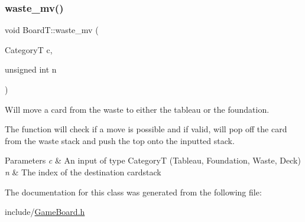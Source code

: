 \subsubsection{\texorpdfstring{waste\+\_\+mv()}{waste\_mv()}}
{\footnotesize\ttfamily void Board\+T\+::waste\+\_\+mv (\begin{DoxyParamCaption}\item[{CategoryT}]{c,  }\item[{unsigned int}]{n }\end{DoxyParamCaption})}



Will move a card from the waste to either the tableau or the foundation. 

The function will check if a move is possible and if valid, will pop off the card from the waste stack and push the top onto the inputted stack. 
\begin{DoxyParams}{Parameters}
{\em c} & An input of type CategoryT (Tableau, Foundation, Waste, Deck) \\
\hline
{\em n} & The index of the destination cardstack \\
\hline
\end{DoxyParams}


The documentation for this class was generated from the following file\+:\begin{DoxyCompactItemize}
\item 
include/\hyperlink{_game_board_8h}{Game\+Board.\+h}\end{DoxyCompactItemize}
